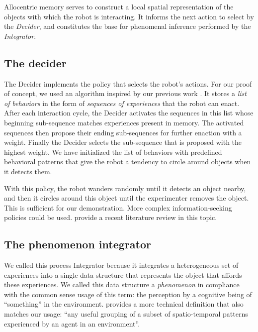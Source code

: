 \documentclass[pmlr]{jmlr}%
\begin{document}
Allocentric memory serves to construct a local spatial representation of the objects with which the robot is interacting.
It informs the next action to select by the \textit{Decider}, and constitutes the base for phenomenal inference performed by the \textit{Integrator}. 

\subsection{The decider}
\label{sec:decider}

The Decider implements the policy that selects the robot's actions. 
For our proof of concept, we used an algorithm inspired by our previous work \citep{georgeon_eca_2013,robertson_biologically_2009}.
It stores a \textit{list of behaviors} in the form of \textit{sequences of experiences} that the robot can enact. 
After each interaction cycle, the Decider activates the sequences in this list whose beginning sub-sequence matches experiences present in memory. 
The activated sequences then propose their ending sub-sequences for further enaction with a weight. 
Finally the Decider selects the sub-sequence that is proposed with the highest weight. 
We have initialized the list of behaviors with predefined behavioral patterns that give the robot a tendency to circle around objects when it detects them. 

With this policy, the robot wanders randomly until it detects an object nearby, and then it circles around this object until the experimenter removes the object. 
This is sufficient for our demonstration. 
More complex information-seeking policies could be used. 
\cite{gottlieb_towards_2018} provide a recent literature review in this topic. 

\subsection{The phenomenon integrator}

We called this process Integrator because it integrates a heterogeneous set of experiences into a single data structure that represents the object that affords these experiences. 
We called this data structure a \textit{phenomenon} in compliance with the common sense usage of this term: the perception by a cognitive being of ``something'' in the environment.
\cite{thorisson_explanation_2021} provides a more technical definition that also matches our usage: ``any useful grouping of a subset of spatio-temporal patterns experienced by an agent in an environment''.
\end{document}
